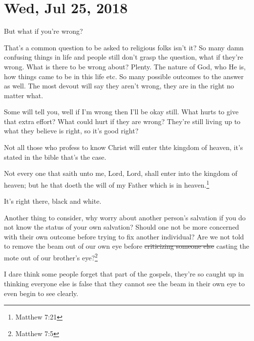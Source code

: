 \section{Wed, Jul 25, 2018}

\centerline{But what if you're wrong?}

That's a common question to be asked to religious folks isn't it? So many damn
confusing things in life and people still don't grasp the question, what if they're
wrong. What is there to be wrong about? Plenty. The nature of God, who He is, how
things came to be in this life etc. So many possible outcomes to the answer as well.
The most devout will say they aren't wrong, they are in the right no matter what.

Some will tell you, well if I'm wrong then I'll be okay still. What hurts to give
that extra effort? What could hurt if they are wrong? They're still living up to what
they believe is right, so it's good right?

Not all those who profess to know Christ will enter thte kingdom of heaven, it's
stated in the bible that's the case.

\begin{displayquote}
Not every one that saith unto me, Lord, Lord, shall enter into the kingdom of heaven;
but he that doeth the will of my Father which is in heaven.\footnote{Matthew 7:21}
\end{displayquote}

It's right there, black and white.

Another thing to consider, why worry about another person's salvation if you do not
know the status of your own salvation? Should one not be more concerned with their
own outcome before trying to fix another individual? Are we not told to remove the
beam out of our own eye before \st{criticizing someone else} casting the mote out of 
our brother's eye?\footnote{Matthew 7:5}

I dare think some people forget that part of the gospels, they're so caught up in
thinking everyone else is false that they cannot see the beam in their own eye to
even begin to see clearly.
